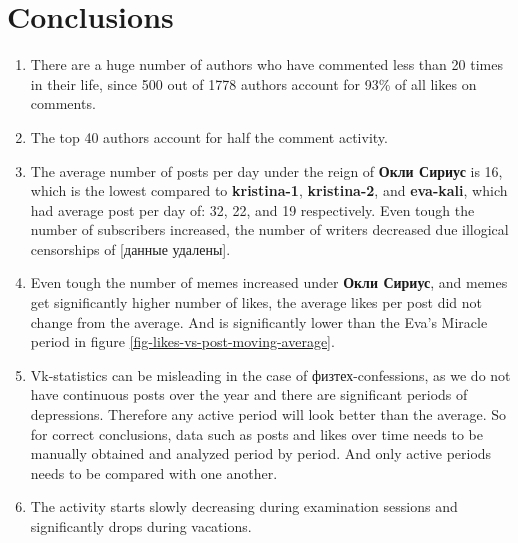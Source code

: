 \documentclass[
	12pt
] {article}
\begin{document}
\section{Conclusions}
	\begin{enumerate}
		\item There are a huge number of authors who have commented less than 20 times in their life, since \num{500} out of \num{1778} authors account for \num{93}\% of all likes on comments.
		
		\item The top 40 authors account for half the comment activity.
		
		\item The average number of posts per day under the reign of \textbf{Окли Сириус} is \num{16}, which is the lowest compared to \textbf{kristina-1}, \textbf{kristina-2}, and \textbf{eva-kali}, which had average post per day of: 32, 22, and 19 respectively. Even tough the number of subscribers increased, the number of writers decreased due illogical censorships of [данные удалены].
		
		\item Even tough the number of memes increased under \textbf{Окли Сириус}, and memes get significantly higher number of likes, the average likes per post did not change from the average. And is significantly lower than the Eva's Miracle period in figure \ref{fig-likes-vs-post-moving-average}.
		
		\item Vk-statistics can be misleading in the case of физтех-confessions, as we do not have continuous posts over the year and there are significant periods of depressions. Therefore any active period will look better than the average. So for correct conclusions, data such as posts and likes over time needs to be manually obtained and analyzed period by period. And only active periods needs to be compared with one another.
		
		\item The activity starts slowly decreasing during examination sessions and significantly drops during vacations.
		
	\end{enumerate}
	
\newpage


\end{document}
